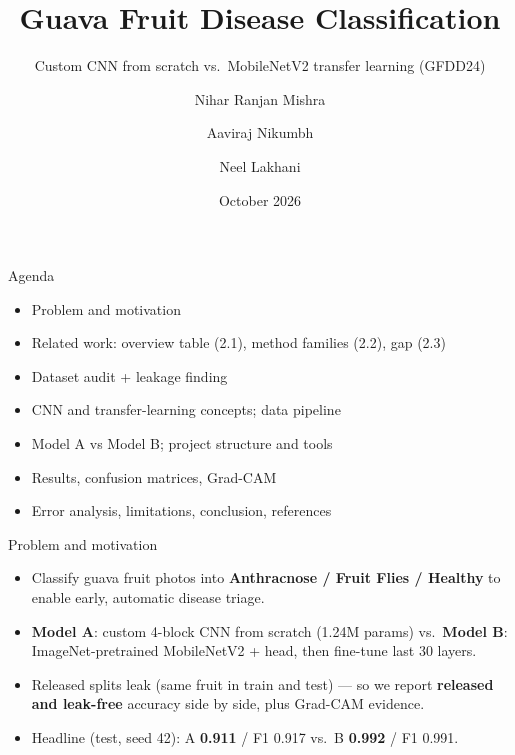 \documentclass[aspectratio=169]{beamer}
\title{Guava Fruit Disease Classification}
\subtitle{Custom CNN from scratch vs.\ MobileNetV2 transfer learning (GFDD24)}
\author{Nihar Ranjan Mishra \and Aaviraj Nikumbh \and Neel Lakhani}
\institute{Course project --- seed 42 everywhere; CPU-only build (Apple Silicon, 224px)}
\date{October 2026}
\begin{document}
\begin{frame}
  \titlepage
\end{frame}
\begin{frame}{Agenda}
  \begin{itemize}
    \item Problem and motivation
    \item Related work: overview table (2.1), method families (2.2), gap (2.3)
    \item Dataset audit + leakage finding
    \item CNN and transfer-learning concepts; data pipeline
    \item Model A vs Model B; project structure and tools
    \item Results, confusion matrices, Grad-CAM
    \item Error analysis, limitations, conclusion, references
  \end{itemize}
\end{frame}
\begin{frame}{Problem and motivation}
  \begin{itemize}
    \item Classify guava fruit photos into \textbf{Anthracnose / Fruit Flies / Healthy} to enable early, automatic disease triage.
    \item \textbf{Model A}: custom 4-block CNN from scratch (1.24M params) vs.\ \textbf{Model B}: ImageNet-pretrained MobileNetV2 + head, then fine-tune last 30 layers.
    \item Released splits leak (same fruit in train and test) --- so we report \textbf{released and leak-free} accuracy side by side, plus Grad-CAM evidence.
    \item Headline (test, seed 42): A \textbf{0.911} / F1 0.917 vs.\ B \textbf{0.992} / F1 0.991.
  \end{itemize}
\end{frame}
\end{document}
